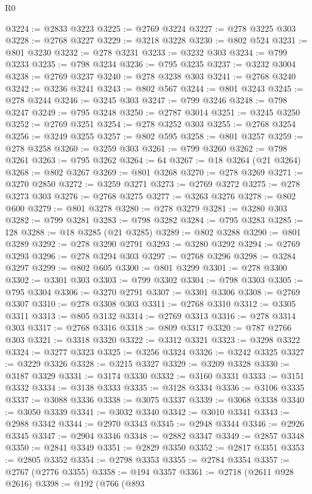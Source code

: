 \begin{lexlean}{R0}
\begin{coremodule}
@3224 := @2833 @3223
@3225 := @2769 @3224
@3227 := @278 @3225 @303
@3228 := @2768 @3227
@3229 := @3218 @3228
@3230 := @802 @524
@3231 := @801 @3230
@3232 := @278 @3231
@3233 := @3232 @303
@3234 := @799 @3233
@3235 := @798 @3234
@3236 := @795 @3235
@3237 := @3232 @3004
@3238 := @2769 @3237
@3240 := @278 @3238 @303
@3241 := @2768 @3240
@3242 := @3236 @3241
@3243 := @802 @567
@3244 := @801 @3243
@3245 := @278 @3244
@3246 := @3245 @303
@3247 := @799 @3246
@3248 := @798 @3247
@3249 := @795 @3248
@3250 := @2787 @3014
@3251 := @3245 @3250
@3252 := @2769 @3251
@3254 := @278 @3252 @303
@3255 := @2768 @3254
@3256 := @3249 @3255
@3257 := @802 @595
@3258 := @801 @3257
@3259 := @278 @3258
@3260 := @3259 @303
@3261 := @799 @3260
@3262 := @798 @3261
@3263 := @795 @3262
@3264 := 64
@3267 := @18 @3264 (@21 @3264)
@3268 := @802 @3267
@3269 := @801 @3268
@3270 := @278 @3269
@3271 := @3270 @2850
@3272 := @3259 @3271
@3273 := @2769 @3272
@3275 := @278 @3273 @303
@3276 := @2768 @3275
@3277 := @3263 @3276
@3278 := @802 @600
@3279 := @801 @3278
@3280 := @278 @3279
@3281 := @3280 @303
@3282 := @799 @3281
@3283 := @798 @3282
@3284 := @795 @3283
@3285 := 128
@3288 := @18 @3285 (@21 @3285)
@3289 := @802 @3288
@3290 := @801 @3289
@3292 := @278 @3290 @2791
@3293 := @3280 @3292
@3294 := @2769 @3293
@3296 := @278 @3294 @303
@3297 := @2768 @3296
@3298 := @3284 @3297
@3299 := @802 @605
@3300 := @801 @3299
@3301 := @278 @3300
@3302 := @3301 @303
@3303 := @799 @3302
@3304 := @798 @3303
@3305 := @795 @3304
@3306 := @3270 @2791
@3307 := @3301 @3306
@3308 := @2769 @3307
@3310 := @278 @3308 @303
@3311 := @2768 @3310
@3312 := @3305 @3311
@3313 := @805 @3132
@3314 := @2769 @3313
@3316 := @278 @3314 @303
@3317 := @2768 @3316
@3318 := @809 @3317
@3320 := @787 @2766 @303
@3321 := @3318 @3320
@3322 := @3312 @3321
@3323 := @3298 @3322
@3324 := @3277 @3323
@3325 := @3256 @3324
@3326 := @3242 @3325
@3327 := @3229 @3326
@3328 := @3215 @3327
@3329 := @3209 @3328
@3330 := @3187 @3329
@3331 := @3174 @3330
@3332 := @3160 @3331
@3333 := @3151 @3332
@3334 := @3138 @3333
@3335 := @3128 @3334
@3336 := @3106 @3335
@3337 := @3088 @3336
@3338 := @3075 @3337
@3339 := @3068 @3338
@3340 := @3050 @3339
@3341 := @3032 @3340
@3342 := @3010 @3341
@3343 := @2988 @3342
@3344 := @2970 @3343
@3345 := @2948 @3344
@3346 := @2926 @3345
@3347 := @2904 @3346
@3348 := @2882 @3347
@3349 := @2857 @3348
@3350 := @2841 @3349
@3351 := @2829 @3350
@3352 := @2817 @3351
@3353 := @2805 @3352
@3354 := @2798 @3353
@3355 := @2784 @3354
@3357 := @2767 (@2776 @3355)
@3358 := @194 @3357
@3361 := @2718 (@2611 @928 @2616)
@3398 := @192
    (@766
      (@893

\end{coremodule}
\end{lexlean}
